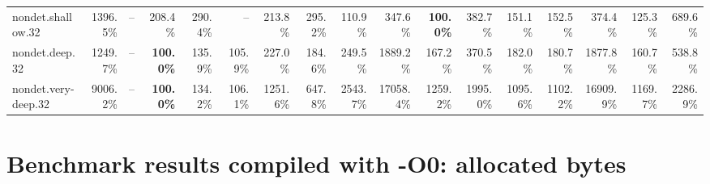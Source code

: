 \documentclass{article}
\begin{document}
\begin{center}
{\begin{tabular}{lrrrrrrrrrrrrrrrr}
nondet.shallow.32 & 1396.5\% & -- & 208.4\% & 290.4\% & -- & 213.8\% & 295.2\% & 110.9\% & 347.6\% & \textbf{100.0\%} & 382.7\% & 151.1\% & 152.5\% & 374.4\% & 125.3\% & 689.6\% \\
nondet.deep.32 & 1249.7\% & -- & \textbf{100.0\%} & 135.9\% & 105.9\% & 227.0\% & 184.6\% & 249.5\% & 1889.2\% & 167.2\% & 370.5\% & 182.0\% & 180.7\% & 1877.8\% & 160.7\% & 538.8\% \\
nondet.very-deep.32 & 9006.2\% & -- & \textbf{100.0\%} & 134.2\% & 106.1\% & 1251.6\% & 647.8\% & 2543.7\% & 17058.4\% & 1259.2\% & 1995.0\% & 1095.6\% & 1102.2\% & 16909.9\% & 1169.7\% & 2286.9\% \\
\bottomrule
\end{tabular}
}
\end{center}

\section*{Benchmark results compiled with -O0: allocated bytes}
\end{document}
